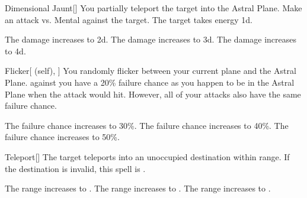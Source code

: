 \lowercase{\hypertarget{spell:Dimensional Jaunt}{}}\label{spell:Dimensional Jaunt}
\begin{freeability}[Rank 1]{\hypertarget{spell:Dimensional Jaunt}{Dimensional Jaunt}}[]
You partially teleport the target into the Astral Plane.
Make an attack vs. Mental against the target.
\hit The target takes energy  \plus1d.

\rankline
{} The damage increases to  \plus2d.
 The damage increases to  \plus3d.
 The damage increases to  \plus4d.
\end{freeability}
\vspace{0.25em}



\lowercase{\hypertarget{spell:Flicker}{}}\label{spell:Flicker}
\begin{attuneability}[Rank 1]{\hypertarget{spell:Flicker}{Flicker}}[ (self), ]
You randomly flicker between your current plane and the Astral Plane.
  against you have a 20\% failure chance as you happen to be in the Astral Plane when the attack would hit.
However, all of your attacks also have the same failure chance.

\rankline
{} The failure chance increases to 30\%.
 The failure chance increases to 40\%.
 The failure chance increases to 50\%.
\end{attuneability}
\vspace{0.25em}



\lowercase{\hypertarget{spell:Teleport}{}}\label{spell:Teleport}
\begin{freeability}[Rank 1]{\hypertarget{spell:Teleport}{Teleport}}[]
The target teleports into an unoccupied destination within range.
If the destination is invalid, this spell is .

\rankline
{} The range increases to \rngmed.
 The range increases to \rnglong.
 The range increases to \rngext.
\end{freeability}
\vspace{0.25em}



